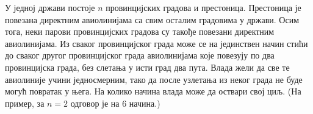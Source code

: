 \problem
У једној држави постоје $n$ провинцијских градова и престоница.
Престоница је повезана директним авиолинијама са свим осталим градовима у
држави.
Осим тога, неки парови провинцијских градова су такође повезани директним
авиолинијама.
Из сваког провинцијског града може се на јединствен начин стићи до сваког
другог провинцијског града авиолинијама које повезују по два провинцијска
града, без слетања у исти град два пута.
Влада жели да све те авиолиније учини једносмерним, тако да после узлетања из
неког града не буде могућ повратак у њега.
На колико начина влада може да оствари свој циљ.
(На пример, за $n = 2$ одговор је на $6$ начина.)

\solution

\endproblem

